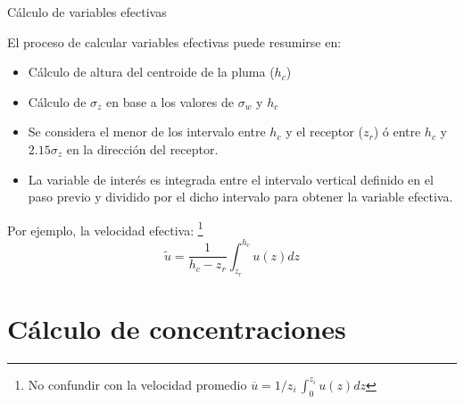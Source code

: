 \begin{frame}{Cálculo de variables efectivas}
 
 
El proceso de calcular variables efectivas puede resumirse en:
\begin{itemize}
 \item Cálculo de altura del centroide de la pluma ($h_c$) 
 \item Cálculo de $\sigma_z$ en base a los valores de $\sigma_w$ y $h_c$
 \item Se considera el menor de los intervalo entre $h_c$ y el receptor ($z_r$) ó entre $h_c$ y $2.15\sigma_z$ en la dirección del receptor.
 \item La variable de interés es integrada entre el intervalo vertical definido en el paso previo y dividido por el dicho intervalo para obtener la variable efectiva.
\end{itemize}

Por ejemplo, la velocidad efectiva: \footnote{No confundir con la velocidad promedio $\overline{u}=1/z_i \, \int_0^{z_i} u(z) dz$}
    $$\tilde{u} = \dfrac{1}{h_c - z_r} \int_{z_r}^{h_c} u(z) dz $$
    
\end{frame}

    


\section{Cálculo de concentraciones}
 
